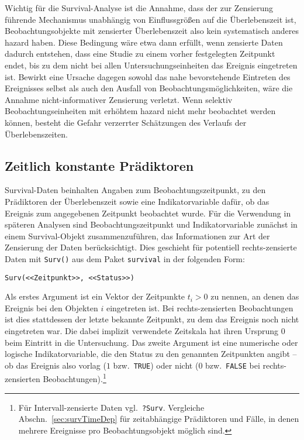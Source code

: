 Wichtig für die Survival-Analyse ist die Annahme, dass der zur Zensierung führende Mechanismus unabhängig von Einflussgrößen auf die Überlebenszeit ist, Beobachtungsobjekte mit zensierter Überlebenszeit also kein systematisch anderes hazard haben. Diese Bedingung wäre etwa dann erfüllt, wenn zensierte Daten dadurch entstehen, dass eine Studie zu einem vorher festgelegten Zeitpunkt endet, bis zu dem nicht bei allen Untersuchungseinheiten das Ereignis eingetreten ist. Bewirkt eine Ursache dagegen sowohl das nahe bevorstehende Eintreten des Ereignisses selbst als auch den Ausfall von Beobachtungsmöglichkeiten, wäre die Annahme nicht-informativer Zensierung verletzt. Wenn selektiv Beobachtungseinheiten mit erhöhtem hazard nicht mehr beobachtet werden können, besteht die Gefahr verzerrter Schätzungen des Verlaufs der Überlebenszeiten.

\subsection{Zeitlich konstante Prädiktoren}
\label{sec:survTimeInd}

Survival-Daten beinhalten Angaben zum Beobachtungszeitpunkt, zu den Prädiktoren der Überlebenszeit sowie eine Indikatorvariable dafür, ob das Ereignis zum angegebenen Zeitpunkt beobachtet wurde. Für die Verwendung in späteren Analysen sind Beobachtungszeitpunkt und Indikatorvariable zunächst in einem Survival-Objekt zusammenzuführen, das Informationen zur Art der Zensierung der Daten berücksichtigt. Dies geschieht für potentiell rechts-zensierte Daten mit \lstinline!Surv()! aus dem Paket \lstinline!survival! in der folgenden Form:
\begin{lstlisting}
Surv(<<Zeitpunkt>>, <<Status>>)
\end{lstlisting}

Als erstes Argument ist ein Vektor der Zeitpunkte $t_{i} > 0$ zu nennen, an denen das Ereignis bei den Objekten $i$ eingetreten ist. Bei rechts-zensierten Beobachtungen ist dies stattdessen der letzte bekannte Zeitpunkt, zu dem das Ereignis noch nicht eingetreten war. Die dabei implizit verwendete Zeitskala hat ihren Ursprung $0$ beim Eintritt in die Untersuchung. Das zweite Argument ist eine numerische oder logische Indikatorvariable, die den Status zu den genannten Zeitpunkten angibt -- ob das Ereignis also vorlag ($1$ bzw.\ \lstinline!TRUE!) oder nicht ($0$ bzw.\ \lstinline!FALSE! bei rechts-zensierten Beobachtungen).\footnote{Für Intervall-zensierte Daten vgl.\ \lstinline!?Surv!. Vergleiche Abschn.\ \ref{sec:survTimeDep} für zeitabhängige Prädiktoren und Fälle, in denen mehrere Ereignisse pro Beobachtungsobjekt möglich sind.}

